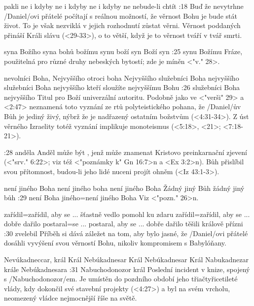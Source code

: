     {pakli ne} %
    {i kdyby ne}  %
    {i kdyby ne} %
    {i kdyby ne}  %
    {nebude-li chtít}  %
:18 {Buď že nevytrhne} \x/Daniel/ovi přátelé počítají s reálnou možností, že věrnost Bohu je bude stát život. To je však nezviklá v jejich rozhodnutí zůstat věrni. Věrnost poddaných přináší Králi slávu (<29-33>), o to větší, když je to věrnost tváří v tvář smrti.

    {syna Božího} %
    {syna bohů}  %
    {božímu synu} %
    {boží syn}  %
    {Boží syn}  %
:25 {synu Božímu} Fráze, použitelná pro různé druhy nebeských bytostí; zde je míněn  <"v." 28>.

    {nevolníci Boha, Nejvyššího} %
    {otroci boha Nejvyššího}  %
    {služebníci Boha nejvyššího} %
    {služebníci Boha nejvyššího}  %
    {kteří sloužíte nejvyššímu Bohu}  %
:26 {služebníci Boha nejvyššího} Titul pro Boží univerzální autoritu. Podobně jako ve
        <"verši" 29> a <2:47> neznamená toto vyznání ze rtů polyteistického pohana, 
        že \x/Daniel/ův Bůh je jediný živý, nýbrž že je nadřazený ostatním božstvům (<4:31-34>).
        Z úst věrného Izraelity totéž vyznání implikuje monoteismus (<5:18>, <21>; <7:18-21>).

:28 {anděla} Anděl může být , jenž může znamenat Kristovo preinkarnační zjevení (<"srv." 6:22>; viz též <"poznámky k" Gn 16:7>n a <Ex 3:2>n). Bůh přislíbil svou přítomnost, budou-li jeho lidé nuceni projít ohněm (<Iz 43:1-3>). 

    {není jiného Boha} %
    {není jiného boha}  %
    {není jiného Boha} %
    {Žádný jiný Bůh}  %
    {žádný jiný bůh}  %
:29 {není Boha jiného}={není jiného Boha} Viz <"pozn." 26>n.

    {zařídil}={zařídil, aby se ... šťastně vedlo} %
    {pomohl ku zdaru}  %
    {zařídil}={zařídil, aby se ... dobře dařilo} %
    {postaral}={se ... postaral, aby se ... dobře dařilo}  %
    {těšili králově přízni}  %
:30 {zvelebil} Příběh si dává záležet na tom, aby bylo jasné, že \x/Daniel/ovi přátelé dosáhli vyvýšení svou věrností  Bohu, nikoliv kompromisem s Babylóňany. 

    {Nevúkadneccar, král}   %
    {Král Nebúkadnesar}   %
    {Král Nebúkadnesar}   %
    {Král Nabukadnezar}   %
    {krále Nebúkadnesara}   %
:31 {Nabuchodonozor král} Poslední incident v knize, spojený s \x/Nabuchodonozor/em. Je umístěn do pozdního období jeho třiačtyřicetileté vlády, kdy dokončil své stavební projekty (<4:27>) a byl na svém vrcholu, neomezený vládce nejmocnější říše na světě. 

